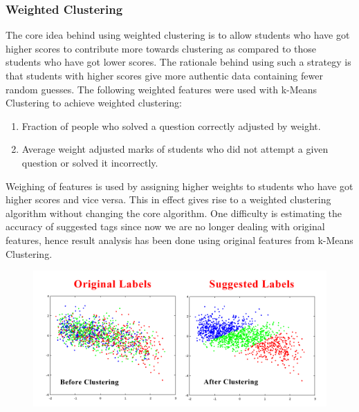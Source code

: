 \documentclass[12pt]{article}
\begin{document}
	
	\newpage
	\subsubsection{Weighted Clustering}
	The core idea behind using weighted clustering is to allow students
	who have got higher scores to contribute more towards clustering as
	compared to those students who have got lower scores. The rationale
	behind using such a strategy is that students with higher scores give
	more authentic data containing fewer random guesses. The following
	weighted features were used with k-Means Clustering to achieve weighted
	clustering:
	\begin{enumerate}
	\item Fraction of people who solved a question correctly adjusted by weight.
	\item Average weight adjusted marks of students who did not attempt a given 
	question or solved it incorrectly.
	\end{enumerate}
	
	Weighing of features is used by assigning higher weights to students who
	have got higher scores and vice versa. This in effect gives rise to a 
	weighted clustering algorithm without changing the core algorithm. One
	difficulty is estimating the accuracy of suggested tags since now we
	are no longer dealing with original features, hence result analysis has been
	done using original features from k-Means Clustering.
	\begin{figure}[h]
	\includegraphics[width=\textwidth]{WeightedClusteringOutput}
	\end{figure}
	
\end{document}
